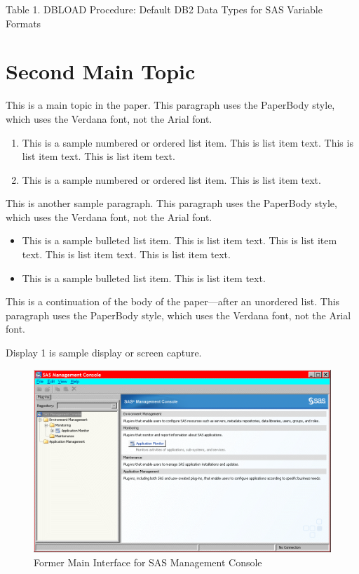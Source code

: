 \documentclass{sugconf}
\begin{document}
Table 1. DBLOAD Procedure: Default DB2 Data Types for SAS Variable Formats 

\section{Second Main Topic}

This is a main topic in the paper. This paragraph uses the PaperBody style, which uses the Verdana font, not the Arial font.

\begin{enumerate}
    \item This is a sample numbered or ordered list item. This is list item text. This is list item text. This is list item text. 
    \item This is a sample numbered or ordered list item. This is list item text.
\end{enumerate}

  This is another sample paragraph. This paragraph uses the PaperBody style, which uses the Verdana font, not the Arial font.

\begin{itemize}
    \item This is a sample bulleted list item. This is list item text. This is list item text. This is list item text. This is list item text.
    \item This is a sample bulleted list item. This is list item text. 
\end{itemize}

This is a continuation of the body of the paper—after an unordered list. This paragraph uses the PaperBody style, which uses the Verdana font, not the Arial font.

Display 1 is sample display or screen capture. 

\begin{figure}[!ht]
    \centering
    \includegraphics[width=\textwidth]{display1}
    {Former Main Interface for SAS Management Console}
\end{figure}
\end{document}
